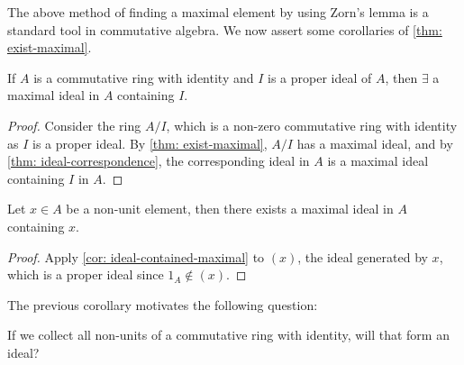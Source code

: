 The above method of finding a maximal element by using Zorn's lemma is a standard tool in commutative algebra. We now assert some corollaries of \cref{thm: exist-maximal}.
\begin{corollary}\label{cor: ideal-contained-maximal}
    If $A$ is a commutative ring with identity and $I$ is a proper ideal of $A$, then $\exists$ a maximal ideal in $A$ containing $I$.
\end{corollary}
\begin{proof}
    Consider the ring $A/I$, which is a non-zero commutative ring with identity as $I$ is a proper ideal. By \cref{thm: exist-maximal}, $A/I$ has a maximal ideal, and by \cref{thm: ideal-correspondence}, the corresponding ideal in $A$ is a maximal ideal containing $I$ in $A$.
\end{proof} 
\begin{corollary}\label{cor: nonunit-contained-maximal}
    Let $x \in A$ be a non-unit element, then there exists a maximal ideal in $A$ containing $x$.
\end{corollary}
\begin{proof}
    Apply \cref{cor: ideal-contained-maximal} to $(x)$, the ideal generated by $x$, which is a proper ideal since $1_A \notin (x)$.
\end{proof}

The previous corollary motivates the following question:
\begin{displayquote}
    If we collect all non-units of a commutative ring with identity, will that form an ideal?
\end{displayquote}

